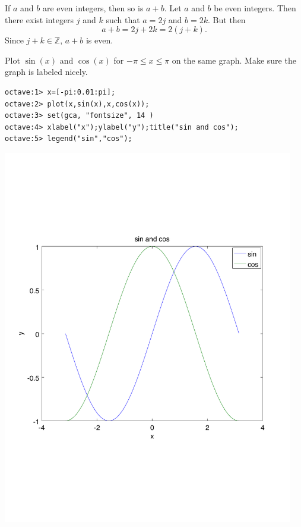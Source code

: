 \documentclass{homework}
\newcommand{\Ints}{\ensuremath{\mathbb Z}} %
\begin{document}
\begin{problems}

\problem 
If $a$ and $b$ are even integers, then so is $a+b$.
\solution
Let $a$ and $b$ be even integers.  Then there exist integers
$j$ and $k$ such that $a=2j$ and $b=2k$.  But then
\begin{equation}
a+b = 2j+ 2k = 2(j+k).
\end{equation}
Since $j+k\in\Ints$, $a+b$ is even.


\problem
Plot $\sin(x)$ and $\cos(x)$ for $-\pi \le x \le \pi$ on the same graph.
Make sure the graph is labeled nicely.
\solution
\begin{verbatim}
octave:1> x=[-pi:0.01:pi];
octave:2> plot(x,sin(x),x,cos(x));
octave:3> set(gca, "fontsize", 14 )
octave:4> xlabel("x");ylabel("y");title("sin and cos");
octave:5> legend("sin","cos");
\end{verbatim}
\begin{center}
\includegraphics[width=5in]{prob2.pdf}
\end{center}

\end{problems}
\end{document}

